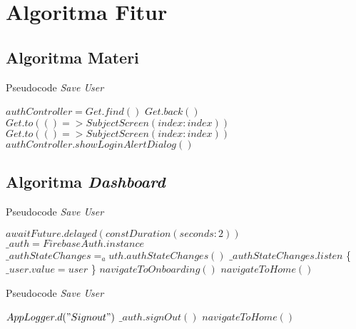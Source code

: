 \section{Algoritma Fitur}

\subsection{Algoritma Materi}
\begin{algorithm}[H]
    \caption{Pseudocode \textit{Save User}}
    \begin{algorithmic}
          \State $authController = Get.find()$
              \State $Get.back()$
              \State $Get.to(() => SubjectScreen(index: index))$
            \Else
              \State $Get.to(() => SubjectScreen(index: index))$
            \EndIf
          \Else
            \State $authController.showLoginAlertDialog()$
          \EndIf
        \EndFunction
    \end{algorithmic}
\end{algorithm}

\subsection{Algoritma \textit{Dashboard}}
\begin{algorithm}[H]
    \caption{Pseudocode \textit{Save User}}
    \begin{algorithmic}
          \State $await Future.delayed(const Duration(seconds: 2))$
          \State $\_auth = FirebaseAuth.instance$
          \State $\_authStateChanges = _auth.authStateChanges()$
          \State $\_authStateChanges.listen$ \{
            \State $\_user.value = user$
          \}
            \State $navigateToOnboarding()$
          \Else
            \State $navigateToHome()$
          \EndIf
        \EndFunction        
    \end{algorithmic}
\end{algorithm}

\begin{algorithm}[H]
    \caption{Pseudocode \textit{Save User}}
    \begin{algorithmic}
          \State $AppLogger.d("Sign out")$
            \State $\_auth.signOut()$
            \State $navigateToHome()$
        \EndFunction
    \end{algorithmic}
\end{algorithm}

